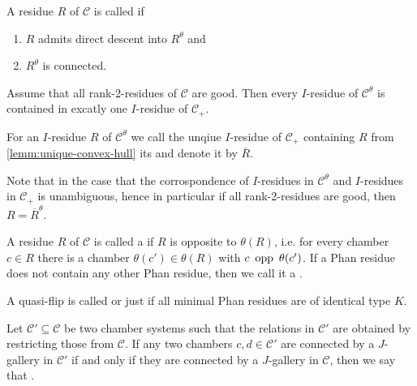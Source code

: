 \begin{defi}
	A residue $R$ of $\mathcal{C}$ is called  if
	\begin{enumerate}
		\item $R$ admits direct descent into $R^\theta$ and
		\item $R^\theta$ is connected.
	\end{enumerate}
\end{defi}

\begin{lemm}
	Assume that all rank-2-residues of $\mathcal C$ are good. Then every $I$-residue of $\mathcal C^\theta$ is contained in excatly one $I$-residue of $\mathcal C_+$.
\end{lemm}

\begin{defi}
	For an $I$-residue $R$ of $\mathcal C^\theta$ we call the unqiue $I$-residue of $\mathcal C_+$ containing $R$ from \ref{lemm:unique-convex-hull} its  and denote it by $\overline R$.
\end{defi}

\begin{rema}
	Note that in the case that the corrospondence of $I$-residues in $\mathcal C^\theta$ and $I$-residues in $\mathcal C_+$ is unambiguous, hence in particular if all rank-2-residues are good, then $R = \overline R^\theta$.
\end{rema}

\begin{defi}
	A residue $R$ of $\mathcal{C}$ is called a  if $R$ is opposite to $\theta(R)$, i.e. for every chamber $c \in R$ there is a chamber $\theta(c') \in \theta(R)$ with $c \opp \theta(c')$. If a Phan residue does not contain any other Phan residue, then we call it a .
\end{defi}

\begin{defi}
	A quasi-flip is called  or just  if all minimal Phan residues are of identical type $K$.
\end{defi}

\begin{defi}
	Let $\mathcal C' \subseteq \mathcal C$ be two chamber systems such that the relations in $\mathcal C'$ are obtained by restricting those from $\mathcal C$. If any two chambers $c,d \in \mathcal C'$ are connected by a $J$-gallery in $\mathcal C'$ if and only if they are connected by a $J$-gallery in $\mathcal C$, then we say that .
\end{defi}

